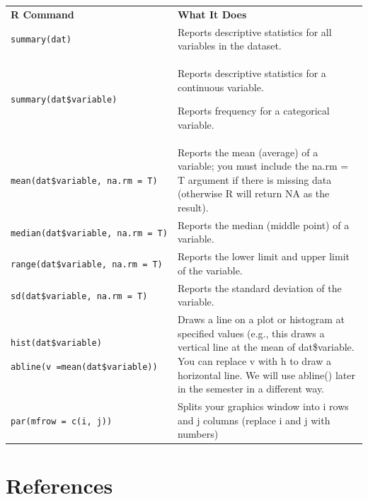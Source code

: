 \documentclass[
  letterpaper,
  DIV=11,
  numbers=noendperiod,
  oneside]{scrreprt}
\newlength{\cslhangindent}
\newenvironment{CSLReferences}[2] %
 {\begin{list}{}{%
  \setlength{\itemindent}{0pt}
  \setlength{\leftmargin}{0pt}
  \setlength{\parsep}{0pt}
  \ifodd #1
   \setlength{\leftmargin}{\cslhangindent}
   \setlength{\itemindent}{-1\cslhangindent}
  \fi
  \setlength{\itemsep}{#2\baselineskip}}}
 {\end{list}}
\begin{document}
\begin{longtable}[]{@{}
  >{\raggedright\arraybackslash}p{}
  >{\raggedright\arraybackslash}p{}@{}}
\toprule\noalign{}
\endhead
\bottomrule\noalign{}
\endlastfoot
\textbf{R Command} & \textbf{What It Does} \\
\texttt{summary(dat)} & Reports descriptive statistics for all variables
in the dataset. \\
\texttt{summary(dat\$variable)} & Reports descriptive statistics for a
continuous variable.

Reports frequency for a categorical variable. \\
\texttt{mean(dat\$variable,\ na.rm\ =\ T)} & Reports the mean (average)
of a variable; you must include the na.rm = T argument if there is
missing data (otherwise R will return NA as the result). \\
\texttt{median(dat\$variable,\ na.rm\ =\ T)} & Reports the median
(middle point) of a variable. \\
\texttt{range(dat\$variable,\ na.rm\ =\ T)} & Reports the lower limit
and upper limit of the variable. \\
\texttt{sd(dat\$variable,\ na.rm\ =\ T)} & Reports the standard
deviation of the variable. \\
\texttt{hist(dat\$variable)}

\texttt{abline(v\ =mean(dat\$variable))} & Draws a line on a plot or
histogram at specified values (e.g., this draws a vertical line at the
mean of dat\$variable. You can replace v with h to draw a horizontal
line. We will use abline() later in the semester in a different way. \\
\texttt{par(mfrow\ =\ c(i,\ j))} & Splits your graphics window into i
rows and j columns (replace i and j with numbers) \\
\end{longtable}

\chapter*{References}\label{references}


\label{refs}
\begin{CSLReferences}{0}{1}
\end{CSLReferences}



\printindex
\end{document}

